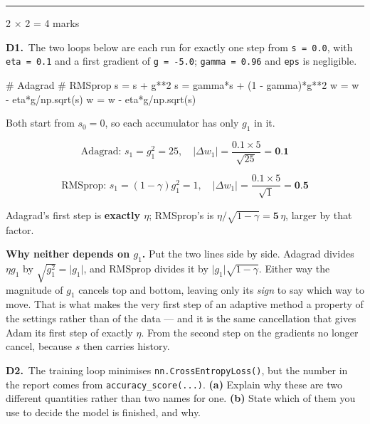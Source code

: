 \documentclass[10pt,a4paper]{article}
\newcommand{\parthead}[2]{\vspace{2pt}\noindent\rule{\linewidth}{0.4pt}\par\vspace{2pt}%
  \noindent{\bfseries Part #1}\hfill{\small #2}\par\vspace{1pt}}
\newcommand{\sol}[1]{\textbf{#1}}
\begin{document}
\newpage

\parthead{D --- Short answer}{2 $\times$ 2 = 4 marks}

\textbf{D1.}\ The two loops below are each run for exactly one step from \texttt{s = 0.0}, with \texttt{eta = 0.1} and a first gradient of \texttt{g = -5.0}; \texttt{gamma = 0.96} and \texttt{eps} is negligible.
\begin{code}
# Adagrad                      # RMSprop
s = s + g**2                   s = gamma*s + (1 - gamma)*g**2
w = w - eta*g/np.sqrt(s)       w = w - eta*g/np.sqrt(s)
\end{code}

\vspace{2pt}

Both start from $s_0 = 0$, so each accumulator has only $g_1$ in it.

\[ \text{Adagrad: } s_1 = g_1^2 = 25, \quad \lvert \Delta w_1 \rvert = \frac{0.1 \times 5}{\sqrt{25}} = \sol{0.1} \]

\[ \text{RMSprop: } s_1 = (1-\gamma) g_1^2 = 1, \quad \lvert \Delta w_1 \rvert = \frac{0.1 \times 5}{\sqrt{1}} = \sol{0.5} \]

Adagrad's first step is \sol{exactly $\eta$}; RMSprop's is $\eta/\sqrt{1-\gamma} = \sol{5}\,\eta$, larger by that factor.

\vspace{2pt}

\textbf{Why neither depends on $g_1$.} Put the two lines side by side. Adagrad divides $\eta g_1$ by $\sqrt{g_1^2} = \lvert g_1 \rvert$, and RMSprop divides it by $\lvert g_1 \rvert \sqrt{1-\gamma}$. Either way the magnitude of $g_1$ cancels top and bottom, leaving only its \emph{sign} to say which way to move. That is what makes the very first step of an adaptive method a property of the settings rather than of the data --- and it is the same cancellation that gives Adam its first step of exactly $\eta$. From the second step on the gradients no longer cancel, because $s$ then carries history.

\vspace{6pt}

\textbf{D2.}\ The training loop minimises \texttt{nn.CrossEntropyLoss()}, but the number in the report comes from \texttt{accuracy\_score(...)}. \textbf{(a)} Explain why these are two different quantities rather than two names for one. \textbf{(b)} State which of them you use to decide the model is finished, and why.

\vspace{2pt}
\end{document}

